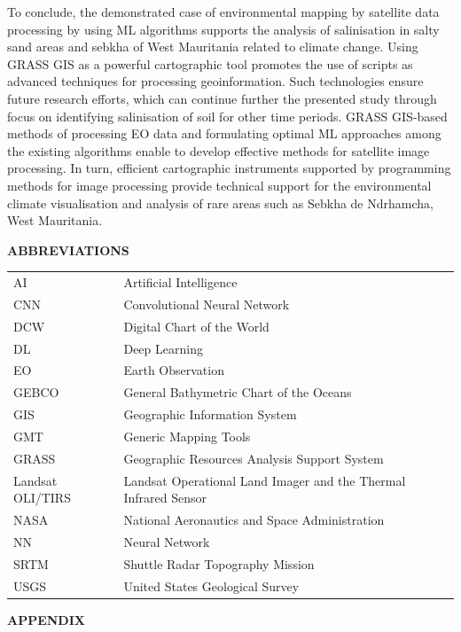 \documentclass[12pt,a4paper,oneside]{article}
\def \newsection{\vspace{12pt}\textbf}
\def \newpar{\vspace{6pt}}
\begin{document}
\newpar To conclude, the demonstrated case of environmental mapping by satellite data processing by using ML algorithms supports the analysis of salinisation in salty sand areas and sebkha of West Mauritania related to climate change. Using GRASS GIS as a powerful cartographic tool promotes the use of scripts as advanced techniques for processing geoinformation. Such technologies ensure future research efforts, which can continue further the presented study through focus on identifying salinisation of soil for other time periods. GRASS GIS-based methods of processing EO data and formulating optimal ML approaches among the existing algorithms enable to develop effective methods for satellite image processing. In turn, efficient cartographic instruments supported by programming methods for image processing provide technical support for the environmental climate visualisation and analysis of rare areas such as Sebkha de Ndrhamcha, West Mauritania.

\vspace{12pt}

\newsection {ABBREVIATIONS}
\vspace{12pt}

\begin{tabular}{@{}ll}
AI & Artificial Intelligence \\
CNN & Convolutional Neural Network \\
DCW & Digital Chart of the World \\
DL & Deep Learning \\
EO & Earth Observation\\
GEBCO & General Bathymetric Chart of the Oceans \\
GIS & Geographic Information System \\
GMT & Generic Mapping Tools \\
GRASS & Geographic Resources Analysis Support System \\
Landsat OLI/TIRS & Landsat Operational Land Imager and the Thermal Infrared Sensor \\
NASA & National Aeronautics and Space Administration \\
NN & Neural Network \\
SRTM & Shuttle Radar Topography Mission \\
USGS & United States Geological Survey
\end{tabular}

\vspace{12pt}

\newsection {APPENDIX}\label{App}
\vspace{12pt}
\end{document}
